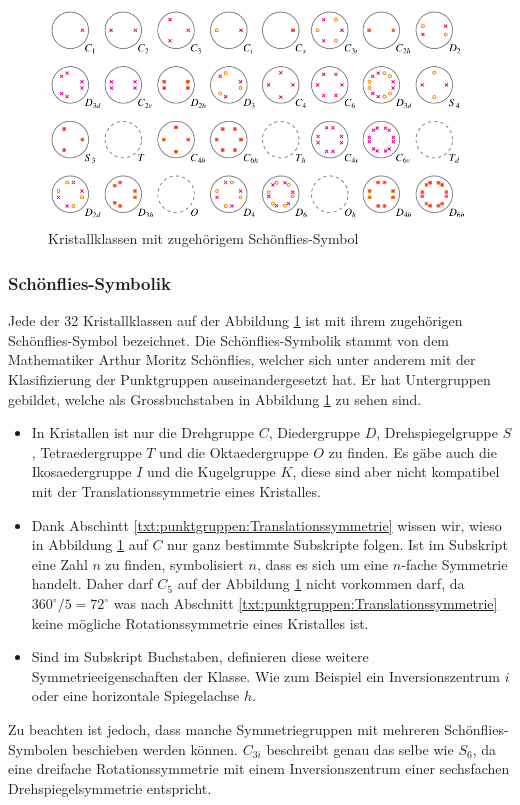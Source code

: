 \begin{figure}
    \centering
    \includegraphics[]{papers/punktgruppen/figures/projections}
    \caption{Kristallklassen mit zugehörigem Schönflies-Symbol}
    \label{fig:punktgruppen:Kristallkassen}
\end{figure}

\subsubsection{Schönflies-Symbolik}

Jede der 32 Kristallklassen auf der Abbildung \ref{fig:punktgruppen:Kristallkassen} ist mit ihrem zugehörigen Schönflies-Symbol bezeichnet.
 Die Schönflies-Symbolik stammt von dem Mathematiker Arthur Moritz Schönflies, welcher sich unter anderem mit der Klasifizierung der Punktgruppen auseinandergesetzt hat.
 Er hat Untergruppen gebildet, welche als Grossbuchstaben in Abbildung \ref{fig:punktgruppen:Kristallkassen} zu sehen sind.
 \begin{itemize}
   \item In Kristallen ist nur die Drehgruppe \(C\), Diedergruppe \(D\), Drehspiegelgruppe \(S\), Tetraedergruppe \(T\) und die Oktaedergruppe \(O\) zu finden.
     Es gäbe auch die Ikosaedergruppe \(I\) und die Kugelgruppe \(K\), diese sind aber nicht kompatibel mit der Translationssymmetrie eines Kristalles.  
   \item Dank Abschintt \ref{txt:punktgruppen:Translationssymmetrie} wissen wir, wieso in Abbildung \ref{fig:punktgruppen:Kristallkassen} auf \(C\) nur ganz bestimmte Subskripte folgen. Ist im Subskript eine Zahl \(n\) zu finden, symbolisiert \(n\), dass  es sich um eine \(n\)-fache Symmetrie handelt.
     Daher darf \(C_5\) auf der Abbildung \ref{fig:punktgruppen:Kristallkassen} nicht vorkommen darf, da \(360^\circ/5 =  72^\circ\) was nach Abschnitt \ref{txt:punktgruppen:Translationssymmetrie} keine mögliche Rotationssymmetrie eines Kristalles ist.
   \item Sind im Subskript Buchstaben, definieren diese weitere Symmetrieeigenschaften der Klasse.
     Wie zum Beispiel ein Inversionszentrum \(i\) oder eine horizontale Spiegelachse \(h\).
 \end{itemize}
Zu beachten ist jedoch, dass manche Symmetriegruppen mit mehreren Schönflies-Symbolen beschieben werden können.
 \(C_{3i}\) beschreibt genau das selbe wie \(S_6\), da eine dreifache Rotationssymmetrie mit einem Inversionszentrum einer sechsfachen Drehspiegelsymmetrie entspricht.




